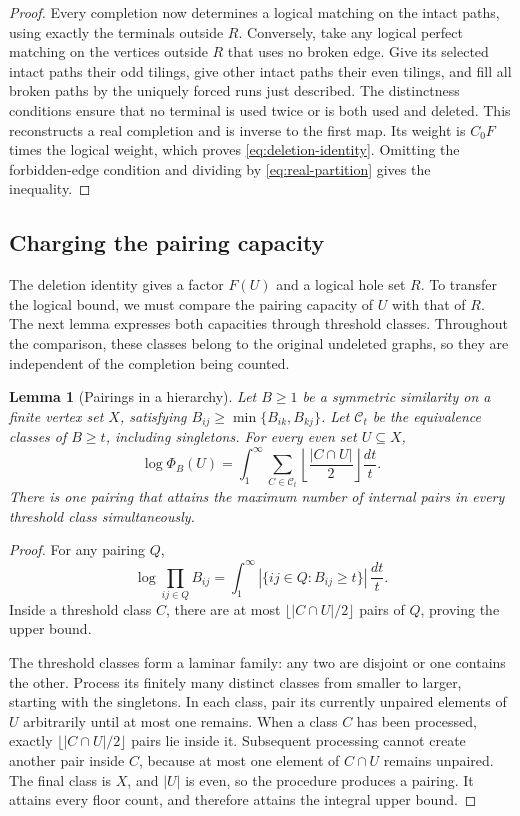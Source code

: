 \documentclass[11pt]{article}
\newtheorem{lemma}[theorem]{Lemma}
\theoremstyle{definition}
\theoremstyle{remark}
\numberwithin{equation}{section}
\begin{document}
\begin{proof}
Every completion now determines a logical matching on the intact
paths, using exactly the terminals outside $R$. Conversely, take
any logical perfect matching on the vertices outside $R$ that uses
no broken edge. Give its selected intact paths their odd tilings,
give other intact paths their even tilings, and fill all broken
paths by the uniquely forced runs just described. The distinctness
conditions ensure that no terminal is used twice or is both used
and deleted. This reconstructs a real completion and is inverse
to the first map. Its weight is $C_0F$ times the logical weight,
which proves \cref{eq:deletion-identity}. Omitting the forbidden-edge
condition and dividing by \cref{eq:real-partition} gives the inequality.
\end{proof}

\subsection{Charging the pairing capacity}

The deletion identity gives a factor $F(U)$ and a logical hole set $R$.
To transfer the logical bound, we must compare the pairing capacity of
$U$ with that of $R$. The next lemma expresses both capacities through
threshold classes. Throughout the comparison, these classes belong to
the original undeleted graphs, so they are independent of the completion
being counted.

\begin{lemma}[Pairings in a hierarchy]
\label{lem:ultrametric-pairing}
Let $B\ge1$ be a symmetric similarity on a finite vertex set $X$,
satisfying $B_{ij}\ge\min\{B_{ik},B_{kj}\}$. Let $\mathcal C_t$ be
the equivalence classes of $B\ge t$, including singletons.
For every even set $U\subseteq X$,
\begin{equation}
\label{eq:threshold-pairing}
 \log\Phi_B(U)
 =\int_1^\infty\sum_{C\in\mathcal C_t}
       \left\lfloor\frac{|C\cap U|}{2}\right\rfloor\frac{dt}{t}.
\end{equation}
There is one pairing that attains the maximum number of internal pairs
in every threshold class simultaneously.
\end{lemma}

\begin{proof}
For any pairing $Q$,
\[
 \log\prod_{ij\in Q}B_{ij}
 =\int_1^\infty
       |\{ij\in Q:B_{ij}\ge t\}|\,\frac{dt}{t}.
\]
Inside a threshold class $C$, there are at most
$\lfloor |C\cap U|/2\rfloor$ pairs of $Q$, proving the upper bound.

The threshold classes form a laminar family: any two are disjoint or one
contains the other.  Process its finitely many distinct classes from
smaller to larger, starting with the singletons.  In each class, pair
its currently unpaired elements of $U$ arbitrarily until at most one
remains.  When a class $C$ has been processed, exactly
$\lfloor|C\cap U|/2\rfloor$ pairs lie inside it.  Subsequent processing
cannot create another pair inside $C$, because at most one element of
$C\cap U$ remains unpaired.  The final class is $X$, and $|U|$ is even,
so the procedure produces a pairing.  It attains every floor count,
and therefore attains the integral upper bound.
\end{proof}
\end{document}
